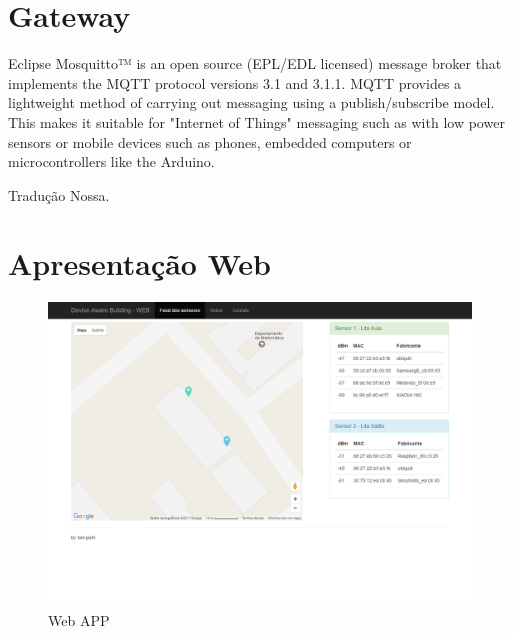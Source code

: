 \section{Gateway}
\label{sec:app-gw}

\begin{citacao}

	Eclipse Mosquitto™ is an open source (EPL/EDL licensed) message broker that
	implements the MQTT protocol versions 3.1 and 3.1.1. MQTT provides a lightweight
	method of carrying out messaging using a publish/subscribe model. This makes it
	suitable for "Internet of Things" messaging such as with low power sensors or
	mobile devices such as phones, embedded computers or microcontrollers like the
	Arduino. \

	 Tradução Nossa.
\end{citacao}


\section{Apresentação Web}
\label{sec:app-web}


\begin{figure}[htb]
	\caption{\label{fig-web-app}Web APP}
	\begin{center}
		\includegraphics[width=1\textwidth]{050-construcao/web-app.png}
	\end{center}
\end{figure}
